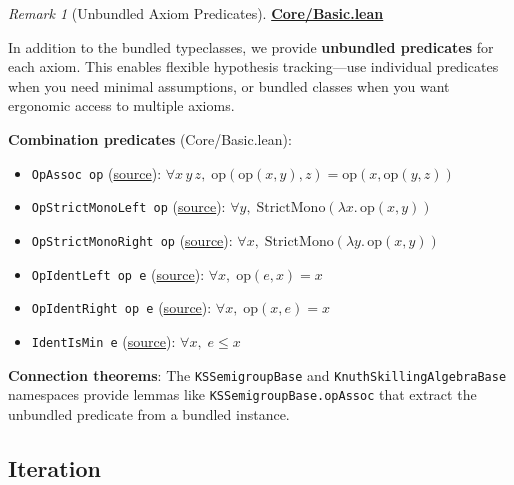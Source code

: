 \documentclass[11pt]{article}
\theoremstyle{definition}
\theoremstyle{remark}
\newtheorem{remark}[theorem]{Remark}
\begin{document}
\begin{remark}[Unbundled Axiom Predicates]
\textbf{\href{https://github.com/zariuq/ks-foundations-of-inference/blob/main/KnuthSkilling/Core/Basic.lean}{Core/Basic.lean}}

In addition to the bundled typeclasses, we provide \textbf{unbundled predicates} for each axiom.
This enables flexible hypothesis tracking---use individual predicates when you need minimal assumptions,
or bundled classes when you want ergonomic access to multiple axioms.

\textbf{Combination predicates} (Core/Basic.lean):
\begin{itemize}
  \item \texttt{OpAssoc op} (\href{https://github.com/zariuq/ks-foundations-of-inference/blob/main/KnuthSkilling/Core/Basic.lean}{source}): $\forall x\, y\, z,\; \text{op}(\text{op}(x, y), z) = \text{op}(x, \text{op}(y, z))$
  \item \texttt{OpStrictMonoLeft op} (\href{https://github.com/zariuq/ks-foundations-of-inference/blob/main/KnuthSkilling/Core/Basic.lean}{source}): $\forall y,\; \text{StrictMono}(\lambda x.\, \text{op}(x, y))$
  \item \texttt{OpStrictMonoRight op} (\href{https://github.com/zariuq/ks-foundations-of-inference/blob/main/KnuthSkilling/Core/Basic.lean}{source}): $\forall x,\; \text{StrictMono}(\lambda y.\, \text{op}(x, y))$
  \item \texttt{OpIdentLeft op e} (\href{https://github.com/zariuq/ks-foundations-of-inference/blob/main/KnuthSkilling/Core/Basic.lean}{source}): $\forall x,\; \text{op}(e, x) = x$
  \item \texttt{OpIdentRight op e} (\href{https://github.com/zariuq/ks-foundations-of-inference/blob/main/KnuthSkilling/Core/Basic.lean}{source}): $\forall x,\; \text{op}(x, e) = x$
  \item \texttt{IdentIsMin e} (\href{https://github.com/zariuq/ks-foundations-of-inference/blob/main/KnuthSkilling/Core/Basic.lean}{source}): $\forall x,\; e \leq x$
\end{itemize}

\textbf{Connection theorems}: The \texttt{KSSemigroupBase} and \texttt{KnuthSkillingAlgebraBase} namespaces
provide lemmas like \texttt{KSSemigroupBase.opAssoc} that extract the unbundled predicate from a bundled instance.
\end{remark}

\subsection{Iteration}
\end{document}
